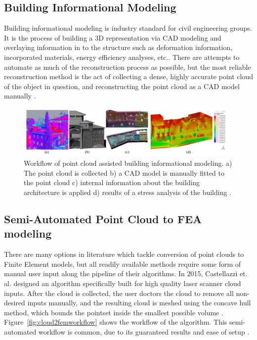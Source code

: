 \documentclass[12pt]{drexelthesis}
\let\Oldsubsection\subsection
\renewcommand{\subsection}{\FloatBarrier\Oldsubsection}
\begin{document}



\subsection{Building Informational Modeling}
\label{subsec:BIM}
Building informational modeling is industry standard for civil engineering groups. It is the process of building a 3D representation via CAD modeling and overlaying information in to the structure such as deformation information, incorporated materials, energy efficiency analyses, etc.. There are attempts to automate as much of the reconstruction process as possible, but the most reliable reconstruction method is the act of collecting a dense, highly accurate point cloud of the object in question, and reconstructing the point cloud as a CAD model manually \cite{RN30}.

\begin{figure}
	\centering
	\includegraphics[width=5in]{introduction/bimworkflow.png}
	\caption[Building informational model workflow]{\centering Workflow of point cloud assisted building informational modeling. a) The point cloud is collected b) a CAD model is manually fitted to the point cloud c) internal information about the building architecture is applied d) results of a stress analysis of the building \cite{RN30}.}
\end{figure}

\subsection{Semi-Automated Point Cloud to FEA modeling}
\label{subsec:SemiFEA}
There are many options in literature which tackle conversion of point clouds to Finite Element models, but all readily available methods require some form of manual user input along the pipeline of their algorithms.  
In 2015, Castellazzi et. al. designed an algorithm specifically built for high quality laser scanner cloud inputs. After the cloud is collected, the user doctors the cloud to remove all non-desired inputs manually, and the resulting cloud is meshed using the concave hull method, which bounds the pointset inside the smallest possible volume \cite{RN29}. Figure~\ref{fig:cloud2femworkflow} shows the workflow of the algorithm. This semi-automated workflow is common, due to its guaranteed results and ease of setup \cite{RN31,RN54}.
\end{document}
